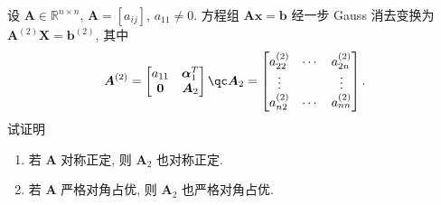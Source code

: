 \documentclass[lang = zh]{iwork}
\begin{document}
\begin{prob}
  设 $\bm{A} \in \mathbb{R}^{n \times n}$, $\bm{A} = [a_{ij}]$, $a_{11} \neq 0$.
  方程组 $\bm{A} \bm{x} = \bm{b}$ 经一步 Gauss 消去变换为 $\bm{A}^{(2)} \bm{X} = \bm{b}^{(2)}$, 其中
  \begin{equation*}
    \bm{A}^{(2)} =
    \begin{bmatrix}
      a_{11} & \bm{\alpha}_1^T \\
      \bm{0} & \bm{A}_2
    \end{bmatrix}
    \qc
    \bm{A}_2 =
    \begin{bmatrix}
      a_{22}^{(2)} & \cdots & a_{2n}^{(2)} \\
      \vdots       &        & \vdots       \\
      a_{n2}^{(2)} & \cdots & a_{nn}^{(2)}
    \end{bmatrix}
    .
  \end{equation*}
  试证明
  \begin{enumerate}
    \item 若 $\bm{A}$ 对称正定, 则 $\bm{A}_2$ 也对称正定.
    \item 若 $\bm{A}$ 严格对角占优, 则 $\bm{A}_2$ 也严格对角占优.
  \end{enumerate}
\end{prob}
\end{document}
